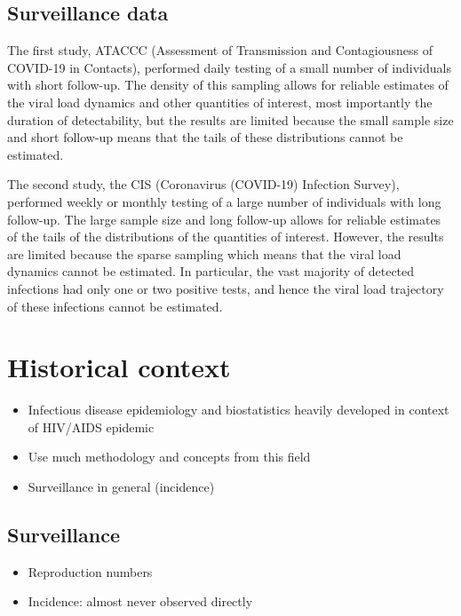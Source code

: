 \documentclass[thesis.tex]{subfiles}
\begin{document}
\subsection{Surveillance data}

The first study, ATACCC (Assessment of Transmission and Contagiousness of COVID-19 in Contacts), performed daily testing of a small number of individuals with short follow-up.
The density of this sampling allows for reliable estimates of the viral load dynamics and other quantities of interest, most importantly the duration of detectability, but the results are limited because the small sample size and short follow-up means that the tails of these distributions cannot be estimated.

The second study, the CIS (Coronavirus (COVID-19) Infection Survey), performed weekly or monthly testing of a large number of individuals with long follow-up.
The large sample size and long follow-up allows for reliable estimates of the tails of the distributions of the quantities of interest.
However, the results are limited because the sparse sampling which means that the viral load dynamics cannot be estimated.
In particular, the vast majority of detected infections had only one or two positive tests, and hence the viral load trajectory of these infections cannot be estimated.

\section{Historical context}

\begin{itemize}
    \item Infectious disease epidemiology and biostatistics heavily developed in context of HIV/AIDS epidemic
    \item Use much methodology and concepts from this field
    \item Surveillance in general (incidence)
\end{itemize}

\subsection{Surveillance}

\begin{itemize}
    \item Reproduction numbers
    \item Incidence: almost never observed directly
\end{itemize}
\end{document}
